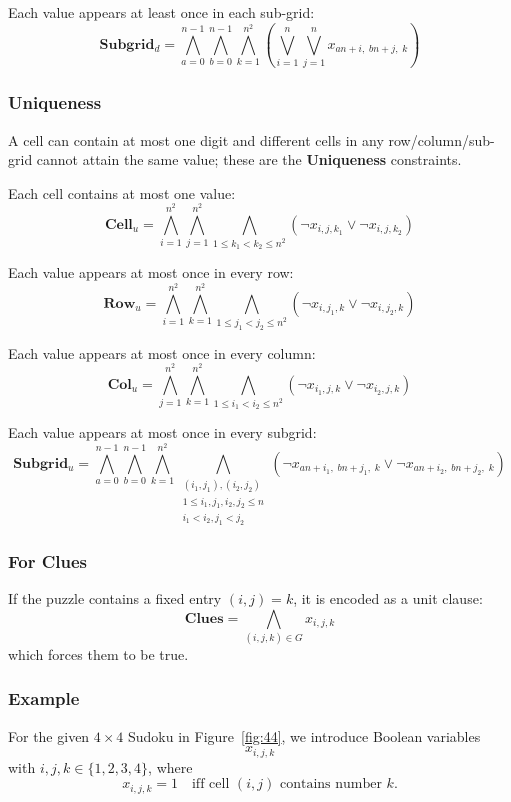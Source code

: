 \documentclass[12pt]{article}
\begin{document}
Each value appears at least once in each sub-grid:
\[
\textbf{Subgrid$_d$} =
\bigwedge_{a=0}^{n-1}
\bigwedge_{b=0}^{n-1}
\bigwedge_{k=1}^{n^2}
\left(
\bigvee_{i=1}^{n}
\bigvee_{j=1}^{n}
x_{an+i,\; bn+j,\; k}
\right)
\]


\subsubsection{Uniqueness} 

A cell can contain at most one digit and different cells in any row/column/sub-grid cannot attain the same value; these are the \textbf{Uniqueness} constraints.


Each cell contains at most one value:
\[
\textbf{Cell$_u$} =
\bigwedge_{i=1}^{n^2}
\bigwedge_{j=1}^{n^2}
\bigwedge_{1 \le k_1 < k_2 \le n^2}
(\neg x_{i,j,k_1} \lor \neg x_{i,j,k_2})
\]

Each value appears at most once in every row:
\[
\textbf{Row$_u$} =
\bigwedge_{i=1}^{n^2}
\bigwedge_{k=1}^{n^2}
\bigwedge_{1 \le j_1 < j_2 \le n^2}
(\neg x_{i,j_1,k} \lor \neg x_{i,j_2,k})
\]

Each value appears at most once in every column:
\[
\textbf{Col$_u$} =
\bigwedge_{j=1}^{n^2}
\bigwedge_{k=1}^{n^2}
\bigwedge_{1 \le i_1 < i_2 \le n^2}
(\neg x_{i_1,j,k} \lor \neg x_{i_2,j,k})
\]

Each value appears at most once in every subgrid:
\[
\textbf{Subgrid$_u$} =
\bigwedge_{a=0}^{n-1}
\bigwedge_{b=0}^{n-1}
\bigwedge_{k=1}^{n^2}
\bigwedge_{\substack{(i_1,j_1),(i_2,j_2) \\ 1 \le i_1,j_1,i_2,j_2 \le n \\ i_1 < i_2, j_1<j_2}}
(\neg x_{an+i_1,\; bn+j_1,\; k}
 \lor
 \neg x_{an+i_2,\; bn+j_2,\; k})
\]

\subsubsection*{For Clues}

If the puzzle contains a fixed entry $(i,j)=k$, it is encoded as a unit clause:
\[
\textbf{Clues} =
\bigwedge_{(i,j,k)\in G} x_{i,j,k}
\]
which forces them to be true.



\subsubsection*{Example}

For the given $4 \times 4$ Sudoku in Figure~\ref{fig:44}, we introduce Boolean variables
\[
x_{i,j,k}
\]
with $i,j,k \in \{1,2,3,4\}$, where
\[
x_{i,j,k} = 1 \quad \text{iff cell } (i,j) \text{ contains number } k.
\]
\end{document}
